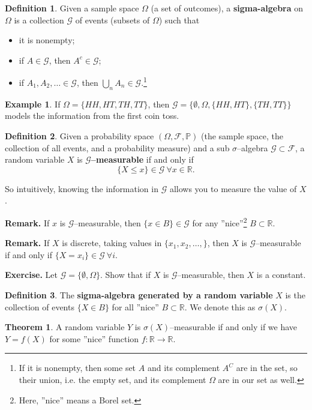 \documentclass{article}
\theoremstyle{definition}
\newtheorem{theorem}{Theorem}[section]
\newtheorem{example}{Example}[section]
\newtheorem{defn}{Definition}[section]
\begin{document}
\begin{defn}
    Given a sample space $\Omega$ (a set of outcomes), a \textbf{sigma-algebra}  on $\Omega$ is a collection $\mathcal{G}$ of events (subsets of $\Omega$) such that
    \begin{itemize}
        \item it is nonempty;
        \item if $A \in \mathcal{G}$, then $A^c \in \mathcal{G}$;
        \item if $A_1,A_2,\ldots \in \mathcal{G}$, then $\bigcup_{n} A_n \in \mathcal{G}$.\footnote{If it is nonempty, then some set $A$ and its complement $A^C$ are in the set, so their union, i.e. the empty set,    and its complement $\Omega$ are in our set as well.}
    \end{itemize} 
\end{defn}
\begin{example}
    If $\Omega = \{HH,HT,TH,TT\}$, then $\mathcal{G} = \{\emptyset, \Omega, \{HH,HT\}, \{TH,TT\}\}$ models the information from the first coin toss.
\end{example}
\begin{defn}
    Given a probability space $(\Omega, \mathcal{F}, \mathbb{P})$ (the sample space, the collection of all events, and a probability measure) and a sub $\sigma$--algebra $\mathcal{G} \subset \mathcal{F}$, a random variable $X$ is \textbf{$\mathcal{G}$--measurable}  if and only if $$\{X \le x\} \in \mathcal{G} ~\forall x \in \mathbb{R}.$$
\end{defn}
So intuitively, knowing the information in $\mathcal{G}$ allows you to measure the value of $X$.

\textbf{Remark.} If $x$ is $\mathcal{G}$--measurable, then $\{x \in B\} \in \mathcal{G}$ for any ''nice''\footnote{Here, ''nice'' means a Borel set.} $B \subset \mathbb{R}$.

\textbf{Remark.} If $X$ is discrete, taking values in $\{x_1,x_2,\ldots,\}$, then $X$ is $\mathcal{G}$--measurable if and only if $\{X = x_i\} \in \mathcal{G} ~\forall i$.

\textbf{Exercise.} Let $\mathcal{G} = \{\emptyset, \Omega\}$. Show that if $X$ is $\mathcal{G}$--measurable, then $X$ is a constant.
\begin{defn}
    The \textbf{sigma-algebra generated by a random variable}  $X$ is the collection of events $\{X \in B\}$ for all ''nice'' $B \subset \mathbb{R}$. We denote this as $\sigma(X)$.
\end{defn}
\begin{theorem}
    A random variable $Y$ is $\sigma(X)$--measurable if and only if we have $Y=f(X)$ for some ''nice'' function $f : \mathbb{R} \to \mathbb{R}$.
\end{theorem}
\end{document}
